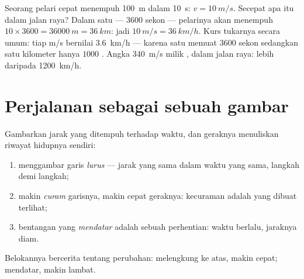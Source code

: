 \begin{example}\label{ex:g7:motion-average-speed:units}
Seorang pelari cepat menempuh \qty{100}{m} dalam \qty{10}{s}: $v = \qty{10}{m/s}$.
Secepat apa itu dalam  jalan raya? Dalam satu  --- $3600$
sekon --- pelarinya akan menempuh $10 \times 3600 = \qty{36000}{m} =
\qty{36}{km}$: jadi $\qty{10}{m/s} = \qty{36}{km/h}$. Kurs tukarnya
secara umum: tiap \unit{m/s} bernilai \qty{3.6}{km/h} ---
karena satu  memuat $3600$ sekon sedangkan satu kilometer hanya
$1000$ . Angka \qty{340}{m/s} milik , dalam  jalan
raya: lebih daripada \qty{1200}{km/h}.
\end{example}

\section{Perjalanan sebagai sebuah gambar}

\begin{proposition}\label{prop:g7:motion-average-speed:graphs}
Gambarkan jarak yang ditempuh terhadap waktu, dan geraknya menuliskan
riwayat hidupnya sendiri:
\begin{enumerate}
  \item {} menggambar garis \emph{lurus} --- jarak yang
        sama dalam waktu yang sama, langkah demi langkah;
  \item makin \emph{curam} garisnya, makin cepat geraknya:
        kecuraman adalah  yang dibuat terlihat;
  \item bentangan yang \emph{mendatar} adalah sebuah perhentian:
        waktu berlalu, jaraknya diam.
\end{enumerate}
Belokannya bercerita tentang perubahan: melengkung ke atas, makin
cepat; mendatar, makin lambat.
\end{proposition}

